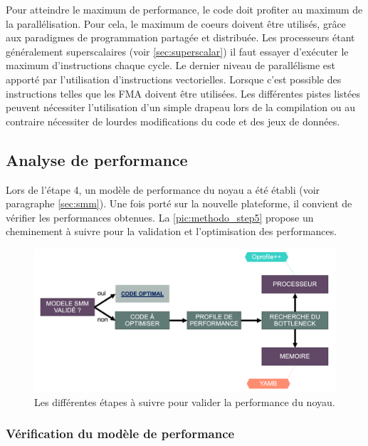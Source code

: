         Pour atteindre le maximum de performance, le code doit profiter au maximum de la parallélisation. Pour cela, le maximum de coeurs doivent être utilisés, grâce aux paradigmes de programmation partagée et distribuée. Les processeurs étant généralement superscalaires (voir \autoref{sec:superscalar}) il faut essayer d'exécuter le maximum d'instructions chaque cycle. Le dernier niveau de parallélisme est apporté par l'utilisation d'instructions vectorielles. Lorsque c'est possible des instructions telles que les FMA doivent être utilisées. Les différentes pistes listées peuvent nécessiter l'utilisation d'un simple drapeau lors de la compilation ou au contraire nécessiter de lourdes modifications du code et des jeux de données.
    

\subsection{Analyse de performance}

    Lors de l'étape 4, un modèle de performance du noyau a été établi (voir paragraphe \ref{sec:smm}). Une fois porté sur la nouvelle plateforme, il convient de vérifier les performances obtenues. La \autoref{pic:methodo_step5} propose un cheminement à suivre pour la validation et l'optimisation des performances.

\begin{figure}[h!]
    \center
    \includegraphics[width=14cm]{images/methodo_step5.png}
    \caption{\label{pic:methodo_step5}Les différentes étapes à suivre pour valider la performance du noyau.}
\end{figure}




    \subsubsection{Vérification du modèle de performance}
    
